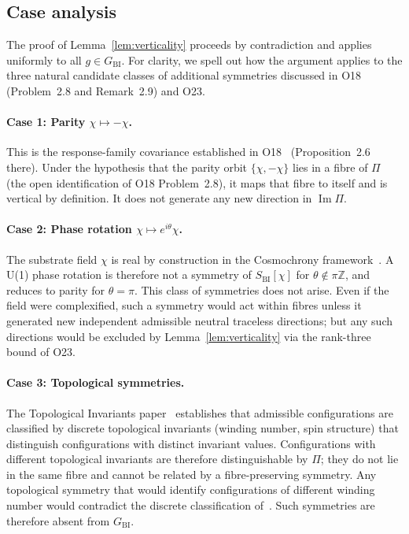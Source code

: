 \documentclass[11pt,a4paper]{article}
\newcommand{\GBI}{G_{\mathrm{BI}}}
\newcommand{\SBI}{S_{\mathrm{BI}}}
\begin{document}
    \subsection{Case analysis}
      \label{sec:cases}

      The proof of Lemma~\ref{lem:verticality} proceeds by contradiction and applies uniformly to
      all $g \in \GBI$.
      For clarity, we spell out how the argument applies to the three natural candidate classes of
      additional symmetries discussed in O18 (Problem~2.8 and Remark~2.9) and O23.

      \paragraph{Case 1: Parity $\chi \mapsto -\chi$.}
        This is the response-family covariance established in O18~\cite{Beau2026a22}
        (Proposition~2.6 there).
        Under the hypothesis that the parity orbit $\{\chi, -\chi\}$ lies in a fibre of $\Pi$
        (the open identification of O18 Problem~2.8), it maps that fibre to itself and is
        vertical by definition.
        It does not generate any new direction in $\operatorname{Im}\Pi$.

      \paragraph{Case 2: Phase rotation $\chi \mapsto e^{i\theta}\chi$.}
        The substrate field $\chi$ is real by construction in the Cosmochrony
        framework~\cite{Cosmochrony}.
        A U(1) phase rotation is therefore not a symmetry of $\SBI[\chi]$ for $\theta \notin \pi\mathbb{Z}$,
        and reduces to parity for $\theta = \pi$.
        This class of symmetries does not arise.
        Even if the field were complexified, such a symmetry would act within fibres unless it generated
        new independent admissible neutral traceless directions; but any such directions would be
        excluded by Lemma~\ref{lem:verticality} via the rank-three bound of O23.

      \paragraph{Case 3: Topological symmetries.}
        The Topological Invariants paper~\cite{Beau2026k} establishes that admissible configurations
        are classified by discrete topological invariants (winding number, spin structure) that
        distinguish configurations with distinct invariant values.
        Configurations with different topological invariants are therefore distinguishable by $\Pi$;
        they do not lie in the same fibre and cannot be related by a fibre-preserving symmetry.
        Any topological symmetry that would identify configurations of different winding number would
        contradict the discrete classification of~\cite{Beau2026k}.
        Such symmetries are therefore absent from $\GBI$.
\end{document}
